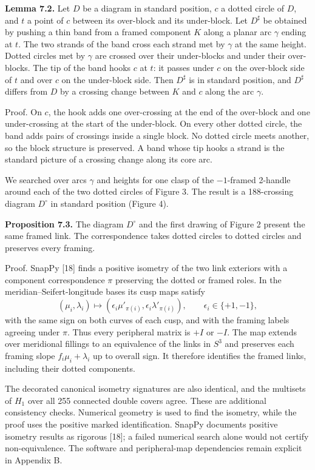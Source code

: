 \documentclass[11pt,letterpaper]{article}
\begin{document}
\medskip\noindent\textbf{Lemma 7.2.} Let $D$ be a diagram in standard position, $c$ a dotted circle of $D$, and $t$ a point of $c$ between its over-block and its under-block. Let $D^\sharp$ be obtained by pushing a thin band from a framed component $K$ along a planar arc $\gamma$ ending at $t$. The two strands of the band cross each strand met by $\gamma$ at the same height. Dotted circles met by $\gamma$ are crossed over their under-blocks and under their over-blocks. The tip of the band hooks $c$ at $t$: it passes under $c$ on the over-block side of $t$ and over $c$ on the under-block side. Then $D^\sharp$ is in standard position, and $D^\sharp$ differs from $D$ by a crossing change between $K$ and $c$ along the arc $\gamma$.

Proof. On $c$, the hook adds one over-crossing at the end of the over-block and one under-crossing at the start of the under-block. On every other dotted circle, the band adds pairs of crossings inside a single block. No dotted circle meets another, so the block structure is preserved. A band whose tip hooks a strand is the standard picture of a crossing change along its core arc.

We searched over arcs $\gamma$ and heights for one clasp of the $-1$-framed 2-handle around each of the two dotted circles of Figure 3. The result is a 188-crossing diagram $D^\circ$ in standard position (Figure 4).

\medskip\noindent\textbf{Proposition 7.3.} The diagram $D^\circ$ and the first drawing of Figure 2 present the same framed link. The correspondence takes dotted circles to dotted circles and preserves every framing.

Proof. SnapPy [18] finds a positive isometry of the two link exteriors with a component correspondence $\pi$ preserving the dotted or framed roles. In the meridian--Seifert-longitude bases its cusp maps satisfy
\[
(\mu_i,\lambda_i)\longmapsto
(\epsilon_i\mu'_{\pi(i)},\epsilon_i\lambda'_{\pi(i)}),
\qquad \epsilon_i\in\{+1,-1\},
\]
with the same sign on both curves of each cusp, and with the framing labels agreeing under $\pi$. Thus every peripheral matrix is $+I$ or $-I$. The map extends over meridional fillings to an equivalence of the links in $S^3$ and preserves each framing slope $f_i\mu_i+\lambda_i$ up to overall sign. It therefore identifies the framed links, including their dotted components.

The decorated canonical isometry signatures are also identical, and the multisets of $H_1$ over all 255 connected double covers agree. These are additional consistency checks. Numerical geometry is used to find the isometry, while the proof uses the positive marked identification. SnapPy documents positive isometry results as rigorous [18]; a failed numerical search alone would not certify non-equivalence. The software and peripheral-map dependencies remain explicit in Appendix B.
\end{document}
